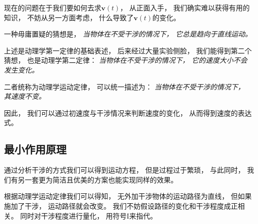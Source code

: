 \documentclass[UTF8,12pt]{ctexart}
\begin{document}
            现在的问题在于我们要如何去求$\textbf{v}(t)$，
            从正面入手，
            我们确实难以获得有用的知识，
            不妨从另一方面考虑，
            什么导致了$\textbf{v}(t)$的变化。
            
            一种毋庸置疑的猜想是，
            \emph{当物体在不受干涉的情况下，
            它总是趋向于直线运动。}

            上述是动理学第一定律的基础表述，
            后来经过大量实验侧脸，
            我们能得到第二个猜想，
            也是动理学第二定律：
            \emph{当物体在不受干涉的情况下，
            它的速度大小不会发生变化。}

            二者统称为动理学运动定律，
            可以统一描述为：
            \emph{当物体在不受干涉的情况下，
            其速度不变。}

            因此，
            我们可以通过初速度与干涉情况来判断速度的变化，
            从而得到速度的表达式。
            \subsection{最小作用原理}
            通过分析干涉的方式我们可以得到运动方程，
            但是过程过于繁琐，
            与此同时，
            我们有另一套更为简洁且优美的方案也能实现同样的效果。

            根据动理学运动定律我们可以得知，
            无外加干涉物体的运动路径为直线，
            但如果施加了干涉，
            运动路径就会改变。
            我们不妨假设路径的变化和干涉程度成正相关。
            同时对干涉程度进行量化，
            用符号I来指代。
            
\end{document}
